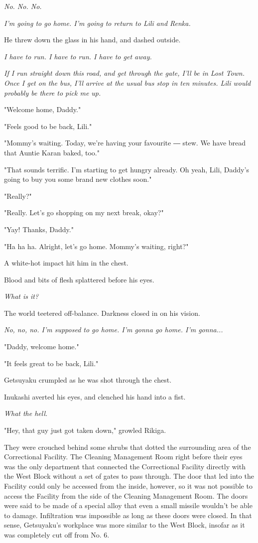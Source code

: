\emph{No. No. No.}

\emph{I'm going to go home. I'm going to return to Lili and Renka.}

He threw down the glass in his hand, and dashed outside.

\emph{I have to run. I have to run. I have to get away.}

\emph{If I run straight down this road, and get through the gate, I'll be in
	Lost Town. Once I get on the bus, I'll arrive at the usual bus stop in
	ten minutes. Lili would probably be there to pick me up.}

"Welcome home, Daddy."

"Feels good to be back, Lili."

"Mommy's waiting. Today, we're having your favourite ― stew. We have
bread that Auntie Karan baked, too."

"That sounds terrific. I'm starting to get hungry already. Oh yeah,
Lili, Daddy's going to buy you some brand new clothes soon."

"Really?"

"Really. Let's go shopping on my next break, okay?"

"Yay! Thanks, Daddy."

"Ha ha ha. Alright, let's go home. Mommy's waiting, right?"

A white-hot impact hit him in the chest.

Blood and bits of flesh splattered before his eyes.

\emph{What is it?}

The world teetered off-balance. Darkness closed in on his vision.

\emph{No, no, no. I'm supposed to go home. I'm gonna go home. I'm gonna...}

"Daddy, welcome home."

"It feels great to be back, Lili."

Getsuyaku crumpled as he was shot through the chest.

\myspace

Inukashi averted his eyes, and clenched his hand into a fist.

\emph{What the hell.}

"Hey, that guy just got taken down," growled Rikiga.

They were crouched behind some shrubs that dotted the surrounding area
of the Correctional Facility. The Cleaning Management Room right before
their eyes was the only department that connected the Correctional
Facility directly with the West Block without a set of gates to pass
through. The door that led into the Facility could only be accessed from
the inside, however, so it was not possible to access the Facility from
the side of the Cleaning Management Room. The doors were said to be made
of a special alloy that even a small missile wouldn't be able to damage.
Infiltration was impossible as long as these doors were closed. In that
sense, Getsuyaku's workplace was more similar to the West Block, insofar
as it was completely cut off from No. 6.

